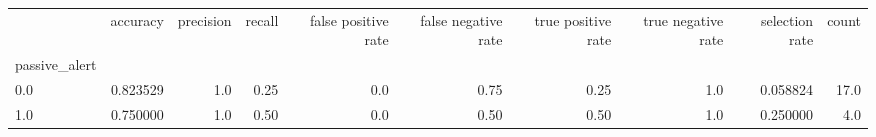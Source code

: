 \begin{tabular}{lrrrrrrrrr}
\toprule
{} &  accuracy &  precision &  recall &  false positive rate &  false negative rate &  true positive rate &  true negative rate &  selection rate &  count \\
passive\_alert &           &            &         &                      &                      &                     &                     &                 &        \\
\midrule
0.0           &  0.823529 &        1.0 &    0.25 &                  0.0 &                 0.75 &                0.25 &                 1.0 &        0.058824 &   17.0 \\
1.0           &  0.750000 &        1.0 &    0.50 &                  0.0 &                 0.50 &                0.50 &                 1.0 &        0.250000 &    4.0 \\
\bottomrule
\end{tabular}
